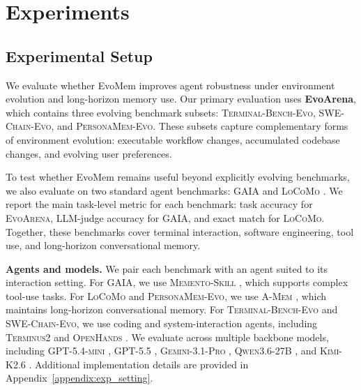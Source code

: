 \documentclass{article}
\begin{document}
\vspace{-3mm}

\section{Experiments}
\subsection{Experimental Setup}

We evaluate whether EvoMem improves agent robustness under environment evolution and long-horizon memory use. Our primary evaluation uses \textbf{EvoArena}, which contains three evolving benchmark subsets: \textsc{Terminal-Bench-Evo}, \textsc{SWE-Chain-Evo}, and \textsc{PersonaMem-Evo}. These subsets capture complementary forms of environment evolution: executable workflow changes, accumulated codebase changes, and evolving user preferences.

To test whether EvoMem remains useful beyond explicitly evolving benchmarks, we also evaluate on two standard agent benchmarks: \textsc{GAIA} \cite{mialon2024gaia} and \textsc{LoCoMo} \cite{locomo}. We report the main task-level metric for each benchmark: task accuracy for \textsc{EvoArena}, LLM-judge accuracy for \textsc{GAIA}, and exact match for \textsc{LoCoMo}. Together, these benchmarks cover terminal interaction, software engineering, tool use, and long-horizon conversational memory.



\textbf{Agents and models.} \quad
We pair each benchmark with an agent suited to its interaction setting. For \textsc{GAIA}, we use \textsc{Memento-Skill} \cite{memento-s}, which supports complex tool-use tasks. For \textsc{LoCoMo} and \textsc{PersonaMem-Evo}, we use \textsc{A-Mem} \cite{xu2025amem}, which maintains long-horizon conversational memory. For \textsc{Terminal-Bench-Evo} and \textsc{SWE-Chain-Evo}, we use coding and system-interaction agents, including \textsc{Terminus2} \cite{terminal-bench} and \textsc{OpenHands} \cite{openhands}. We evaluate across multiple backbone models, including \textsc{GPT-5.4-mini} \cite{openai2026gpt54mini}, \textsc{GPT-5.5} \cite{openai2026gpt55}, \textsc{Gemini-3.1-Pro} \cite{google2026gemini31pro}, \textsc{Qwen3.6-27B} \cite{qwen2026qwen36_27b}, and \textsc{Kimi-K2.6} \cite{moonshot2026kimi_k26}. Additional implementation details are provided in Appendix~\ref{appendix:exp_setting}.
\end{document}
